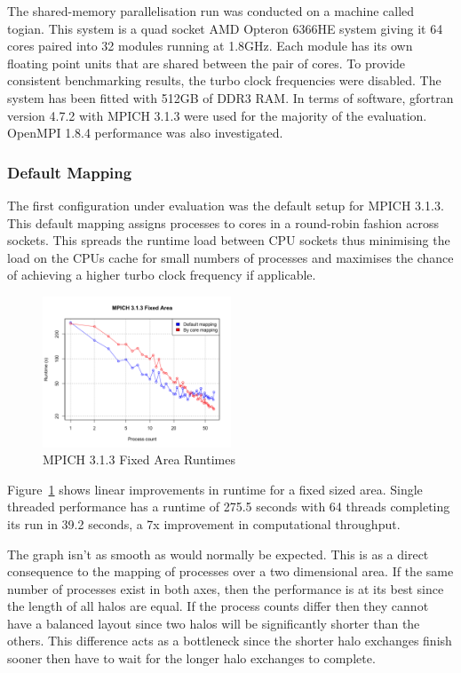 The shared-memory parallelisation run was conducted on a machine called togian.
This system is a quad socket AMD Opteron 6366HE system giving it 64 cores paired
into 32 modules running at 1.8GHz. Each module has its own floating point units
that are shared between the pair of cores. To provide consistent benchmarking
results, the turbo clock frequencies were disabled. The system has been fitted
with 512GB of DDR3 RAM. In terms of software, gfortran version 4.7.2 with MPICH
3.1.3 were used for the majority of the evaluation. OpenMPI 1.8.4 performance
was also investigated.

\subsubsection{Default Mapping}

The first configuration under evaluation was the default setup for MPICH 3.1.3.
This default mapping assigns processes to cores in a round-robin fashion across
sockets. This spreads the runtime load between CPU sockets thus minimising the
load on the CPUs cache for small numbers of processes and maximises the chance
of achieving a higher turbo clock frequency if applicable.

\begin{figure}
    \includegraphics[width=0.5\textwidth]{graphs/MPICH313-fixed-area.png}
    \caption{MPICH 3.1.3 Fixed Area Runtimes}
    \label{fig:mpichfixedarea}
\end{figure}

Figure~\ref{fig:mpichfixedarea} shows linear improvements in runtime for a fixed
sized area. Single threaded performance has a runtime of 275.5 seconds with 64
threads completing its run in 39.2 seconds, a 7x improvement in computational
throughput.

The graph isn't as smooth as would normally be expected. This is as a direct
consequence to the mapping of processes over a two dimensional area. If the same
number of processes exist in both axes, then the performance is at its best
since the length of all halos are equal. If the process counts differ then they
cannot have a balanced layout since two halos will be significantly shorter than
the others. This difference acts as a bottleneck since the shorter halo
exchanges finish sooner then have to wait for the longer halo exchanges to
complete.


